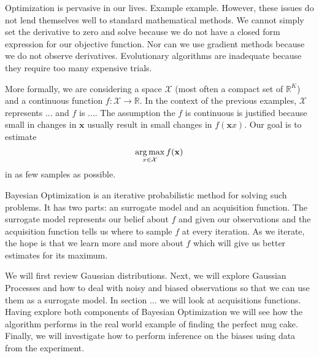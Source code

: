 Optimization is pervasive in our lives.
Example example.
However, these issues do not lend themselves well to standard mathematical methods.
We cannot simply set the derivative to zero and solve because we do not have a closed form expression for our objective function.
Nor can we use gradient methods because we do not observe derivatives.
Evolutionary algorithms are inadequate because they require too many expensive trials.

More formally, we are considering a space $\mathcal{X}$ (most often a compact set of $\mathbb{R}^{K}$) and a continuous function $f: \mathcal{X} \to \mathbb{R}$.
In the context of the previous examples, $\mathcal{X}$ represents ... and $f$ is ....
The assumption the $f$ is continuous is justified because small in changes in $\mathbf{x}$ usually result in small changes in $f(\mathbf{x}x)$.
Our goal is to estimate
\begin{equation*}
    \operatorname*{arg\,max}_{x \in \mathcal{X}} f(\mathbf{x})
\end{equation*}
in as few samples as possible.

Bayesian Optimization is an iterative probabilistic method for solving such problems.
It has two parts: an surrogate model and an acquisition function.
The surrogate model represents our belief about $f$ and given our observations
and the acquisition function tells us where to sample $f$ at every iteration.
As we iterate, the hope is that we learn more and more about $f$ which will give us better estimates for its maximum.

We will first review Gaussian distributions.
Next, we will explore Gaussian Processes and how to deal with noisy and biased observations
so that we can use them as a surrogate model.
In section ... we will look at acquisitions functions.
Having explore both components of Bayesian Optimization we will see how the algorithm performs in the real world example of finding the perfect mug cake.
Finally, we will investigate how to perform inference on the biases using data from the experiment.
